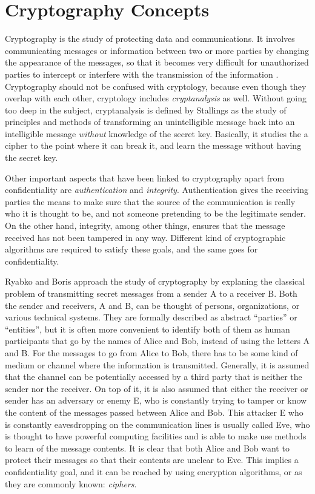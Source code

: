 \section{Cryptography Concepts}

Cryptography is the study of protecting data and communications. It involves communicating messages or information between two or more parties by changing the appearance of the messages, so that it becomes very difficult for unauthorized parties to intercept or interfere with the transmission of the information \cite{IntroCryptoMath}. Cryptography should not be confused with cryptology, because even though they overlap with each other, cryptology includes \emph{cryptanalysis} as well. Without going too deep in the subject, cryptanalysis is defined by Stallings \cite{CryptoStallings}  as the study of principles and methods of transforming an unintelligible message back into an intelligible message \emph{without} knowledge of the secret key. Basically, it studies the a cipher to the point where it can break it, and learn the message without having the secret key.

Other important aspects that have been linked to cryptography apart from confidentiality are \textit{authentication} and \textit{integrity}. Authentication gives the receiving parties the means to make sure that the source of the communication is really who it is thought to be, and not someone pretending to be the legitimate sender. On the other hand, integrity, among other things, ensures that the message received has not been tampered in any way. Different kind of cryptographic algorithms are required to satisfy these goals, and the same goes for confidentiality.

Ryabko and Boris \cite{CryptoIT} approach the study of cryptography by explaning the classical problem of transmitting secret messages from a sender A to a receiver B. Both the sender and receivers, A and B, can be thought of persons, organizations, or various technical systems.  They are formally described as abstract ``parties'' or ``entities'', but it is often more convenient to identify both of them as human participants that go by the names of Alice and Bob, instead of using the letters A and B.
For the messages to go from Alice to Bob, there has to be some kind of medium or channel where the information is transmitted. Generally, it is assumed that the channel can be potentially accessed by a third party that is neither the sender nor the receiver. On top of it, it is also assumed that either the receiver or sender has an adversary or enemy E, who is constantly trying to tamper or know the content of the messages passed between Alice and Bob. This attacker E who is constantly eavesdropping on the communication lines is usually called Eve, who is thought to have powerful computing facilities and is able to make use methods to learn of the message contents.  It is clear that both Alice and Bob want to protect their messages so that their contents are unclear to Eve. This implies a confidentiality goal, and it can be reached by using encryption algorithms, or as they are commonly known: \emph{ciphers}.

